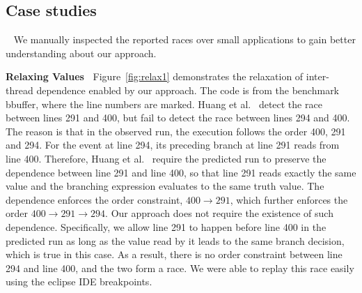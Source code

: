 








  



\subsection{Case studies}~\label{sec:cases}
We manually inspected the reported races over small applications to gain better understanding about our approach. 

{\bf Relaxing Values\ } Figure~\ref{fig:relax1} demonstrates the relaxation of inter-thread dependence enabled by our approach. 
The code is from the benchmark {\sf bbuffer}, where the line numbers are
marked. Huang et al.~\cite{pldi14} detect the race between lines 291 and 400, 
but fail to detect the race between lines 294 and 400. The reason is 
that in the observed run, the execution follows the order 400, 291 and 294. 
For the event at line 294, its preceding branch at line 291 reads 
from line 400. Therefore, Huang et al.~\cite{pldi14}
require the predicted run to preserve the dependence between line 291 and 
line 400, so that line 291 reads exactly the same value and the branching 
expression evaluates to the same truth value. The dependence enforces 
the order constraint, $400 \rightarrow 291$, which further enforces 
the order $400\rightarrow 291 \rightarrow 294$.    Our approach does not 
require the existence of such dependence. Specifically, we allow line 
291 to happen before line 400 in the predicted run as long as the value 
read by it leads to the same branch decision, which is true in this case.  
As a result, there is no order constraint between line 294 and 
line 400, and the two form a race. We were able to replay this race  
easily using the eclipse IDE breakpoints. 


